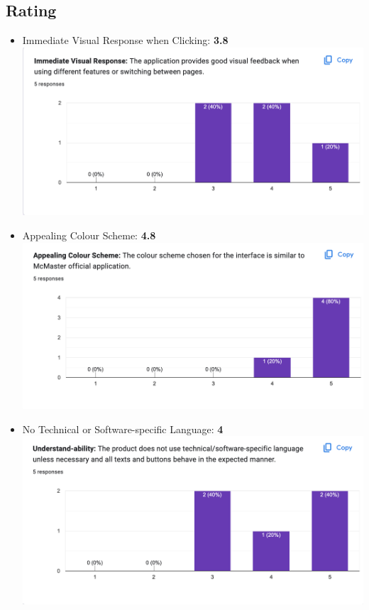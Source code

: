 \documentclass[12pt, titlepage]{article}
\begin{document}
\subsection{Rating}
\begin{itemize}
\item Immediate Visual Response when Clicking: \textbf{3.8}\\
\includegraphics[scale=0.4]{Q1.png}
\item Appealing Colour Scheme: \textbf{4.8}\\
\includegraphics[scale=0.4]{Q2.png}
\item No Technical or Software-specific Language: \textbf{4}\\
\includegraphics[scale=0.4]{Q3.png}

\end{itemize}
\end{document}
